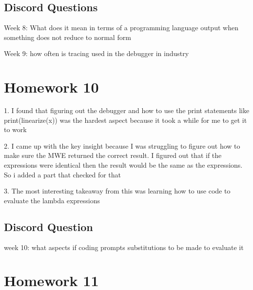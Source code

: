 \documentclass{article}
\theoremstyle{plain}
\theoremstyle{definition}
\theoremstyle{remark}
\begin{document}
\subsection{Discord Questions}

Week 8: What does it mean in terms of a programming language output when something does not reduce to normal form

Week 9: how often is tracing used in the debugger in industry


\section{Homework 10}\label{homework10}

1. I found that figuring out the debugger and how to use the print statements like print(linearize(x)) was the hardest aspect because it took a while for me to get it to work

2. I came up with the key insight because I was struggling to figure out how to make sure the MWE returned the correct result. I figured out that if the expressions were identical then the result would be the same as the expressions. So i added a part that checked for that

3. The most interesting takeaway from this was learning how to use code to evaluate the lambda expressions

\subsection{Discord Question}

week 10: what aspects if coding prompts substitutions to be made to evaluate it

\section{Homework 11}\label{homework11}
\end{document}
